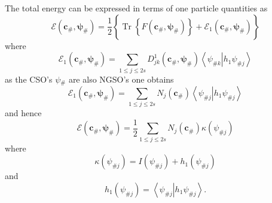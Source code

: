 \documentclass[aps,preprint]{revtex4}%
\begin{document}
The total energy can be expressed in terms of one particle quantities as\
\[
\mathcal{E}\left(  \mathbf{c}_{\#},\mathbf{\psi}_{\#}\right)  =\frac{1}%
{2}\left\{  \overset{}{\operatorname{Tr}\left\{  F\left(  \mathbf{c}%
_{\#},\mathbf{\psi}_{\#}\right)  \right\}  +\mathcal{E}_{1}\left(
\mathbf{c}_{\#},\mathbf{\psi}_{\#}\right)  }\right\}
\]
where
\[
\mathcal{E}_{1}\left(  \mathbf{c}_{\#},\mathbf{\psi}_{\#}\right)  =\sum_{1\leq
j\leq2s}D_{jk}^{1}\left(  \mathbf{c}_{\#},\mathbf{\psi}_{\#}\right)
\left\langle \left.  \psi_{\#k}\right\vert h_{1}\psi_{\#j}\right\rangle
\]
as the CSO's \textbf{$\psi$}$_{\#}$ are also NGSO's one obtains
\[
\mathcal{E}_{1}\left(  \mathbf{c}_{\#},\mathbf{\psi}_{\#}\right)  =\sum_{1\leq
j\leq2s}N_{j}\left(  \mathbf{c}_{\#}\right)  \left\langle \left.  \psi
_{\#j}\right\vert h_{1}\psi_{\#j}\right\rangle
\]
and hence
\[
\mathcal{E}\left(  \mathbf{c}_{\#},\mathbf{\psi}_{\#}\right)  =\frac{1}{2}%
\sum_{1\leq j\leq2s}N_{j}\left(  \mathbf{c}_{\#}\right)  \kappa\left(
\psi_{\#j}\right)
\]
where
\[
\kappa\left(  \psi_{\#j}\right)  =I\left(  \psi_{\#j}\right)  +h_{1}\left(
\psi_{\#j}\right)
\]
and
\[
h_{1}\left(  \psi_{\#j}\right)  =\left\langle \left.  \psi_{\#j}\right\vert
h_{1}\psi_{\#j}\right\rangle .
\]
\end{document}
